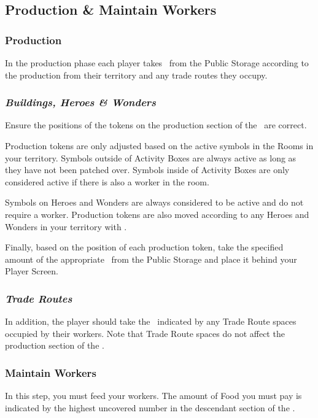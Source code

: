 \documentclass[10pt,twocolumn]{article}
\begin{document}
\subsection{Production \& Maintain Workers}
\subsubsection{Production}
In the production phase each player takes \goods\ from the Public Storage according to the production from their territory and any trade routes they occupy.

\subsubsection*{\textit{Buildings, Heroes \& Wonders}}
Ensure the positions of the tokens on the production section of the \psb\ are correct.

Production tokens are only adjusted based on the active symbols in the Rooms in your territory. Symbols outside of Activity Boxes are always active as long as they have not been patched over. Symbols inside of Activity Boxes are only considered active if there is also a worker in the room.

Symbols on Heroes and Wonders are always considered to be active and do not require a worker. Production tokens are also moved according to any Heroes and Wonders in your territory with \iftoggle{original-rules}{``R'' abilities}{abilities with a cog symbol}.

Finally, based on the position of each production token, take the specified amount of the appropriate \good\ from the Public Storage and place it behind your Player Screen.

\subsubsection*{\textit{Trade Routes}}
In addition, the player should take the \goodss\ indicated by any Trade Route spaces occupied by their workers. Note that Trade Route spaces do not affect the production section of the \psb.

\subsubsection{Maintain Workers}
In this step, you must feed your workers. The amount of Food you must pay is indicated by the highest uncovered number in the descendant section of the \psb.
\end{document}
